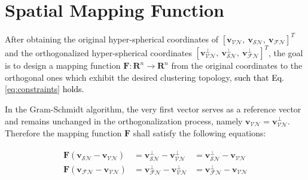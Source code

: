 \section{Spatial Mapping Function}
After obtaining the original hyper-spherical coordinates of $[\mathbf{v}_{\mathcal{VN}},~\mathbf{v}_{\mathcal{SN}},~\mathbf{v}_{\mathcal{FN}}]^T$ and the orthogonalized hyper-spherical coordinates $[\mathbf{v}_{\mathcal{VN}}^{\perp},~\mathbf{v}_{\mathcal{SN}}^{\perp},~\mathbf{v}_{\mathcal{FN}}^{\perp}]^T$, the goal is to design a mapping function $\mathbf{F}: \mathbf{R}^n \to \mathbf{R}^n$ from the original coordinates to the orthogonal ones which exhibit the desired clustering topology, \textcolor{black}{such that Eq. \ref{eq:constraints} holds.}

In the Gram-Schmidt algorithm, the very first vector serves as a reference vector and remains unchanged in the orthogonalization process, namely $\mathbf{v}_{\mathcal{VN}} = \mathbf{v}_{\mathcal{VN}}^{\perp}$. Therefore the mapping function $\mathbf{F}$ shall satisfy the following equations:

\begin{align}
\label{eq:constraints}
\begin{aligned}
\mathbf{F}(\mathbf{v}_{\mathcal{SN}} - \mathbf{v}_{\mathcal{VN}}) &= \mathbf{v}_{\mathcal{SN}}^{\perp} - \mathbf{v}_{\mathcal{VN}}^{\perp} &= \mathbf{v}_{\mathcal{SN}}^{\perp} - \mathbf{v}_{\mathcal{VN}}\\
\mathbf{F}(\mathbf{v}_{\mathcal{FN}} - \mathbf{v}_{\mathcal{VN}}) &= \mathbf{v}_{\mathcal{FN}}^{\perp} - \mathbf{v}_{\mathcal{VN}}^{\perp} &= \mathbf{v}_{\mathcal{FN}}^{\perp} - \mathbf{v}_{\mathcal{VN}}
\end{aligned}
\end{align}

